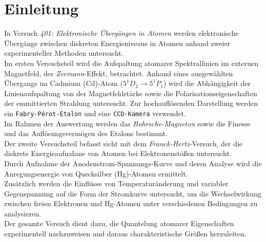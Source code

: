 \chapter{Einleitung}
In Versuch \textit{401: Elektronische Übergängen in Atomen} werden elektronische Übergänge zwischen diskreten Energieniveaus in Atomen anhand zweier experimenteller
Methoden untersucht.
\vspace{0.3cm}\\
Im ersten Versuchsteil wird die Aufspaltung atomarer Spektrallinien im externen Magnetfeld, der \textit{Zeemann}-Effekt, betrachtet. Anhand eines ausgewählten
Übergangs im Cadmium (Cd)-Atom ($5^1D_2 \rightarrow 5^1P_1$) wird die Abhängigkeit der Linienaufspaltung von der Magnetfeldstärke sowie die Polarisationseigenschaften der 
emmittierten Strahlung untersucht. Zur hochauflösenden Darstellung werden ein \texttt{Fabry-Pérot-Etalon} und eine \texttt{CCD-Kamera} verwendet.\\
Im Rahmen der Auswertung werden das \textit{Bohrsche-Magneton} sowie die Finesse und das Auflösungsvermögen des Etalons bestimmt.
\vspace{0.3cm}\\
Der zweite Versuchsteil befasst sicht mit dem  \textit{Franck-Hertz}-Versuch, der die diskrete Energieaufnahme von Atomen bei Elektronenstößen untersucht.\\
Durch Aufnahme der Anodenstrom-Spannungs-Kurve und deren Analyse wird die Anregungsenergie von Quecksilber (Hg)-Atomen ermittelt.\\
Zusätzlich werden die Einflüsse von Temperaturänderung und variabler Gegenspannung auf die Form der Stromkurve untersucht, um die Wechselwirkung zwischen freien Elektronen und Hg-Atomen
unter verschiedenen Bedingungen zu analysieren.
\vspace{0.3cm}\\
Der gesamte Versuch dient dazu, die Quantelung atomarer Eigenschaften experimentell nachzuweisen und daraus charakteristische Größen herzuleiten.

